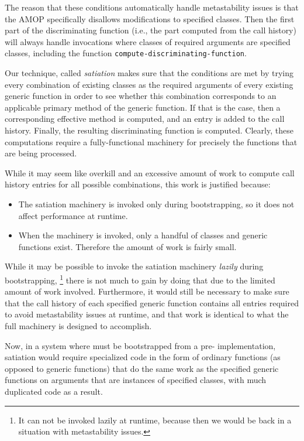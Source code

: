 The reason that these conditions automatically handle
metastability issues is that the AMOP specifically disallows
modifications to specified classes.  Then the first part of the
discriminating function (i.e., the part computed from the call
history) will always handle invocations where classes of required
arguments are specified classes, including the function
\texttt{compute-discriminating-function}. 

Our technique, called \emph{satiation} makes sure that the
conditions are met by trying every combination of existing classes as
the required arguments of every existing generic function in order to
see whether this combination corresponds to an applicable primary
method of the generic function.  If that is the case, then a
corresponding effective method is computed, and an entry is added to
the call history.  Finally, the resulting discriminating function is
computed.  Clearly, these computations require a fully-functional
machinery for precisely the functions that are being processed. 

While it may seem like overkill and an excessive amount of work to
compute call history entries for all possible combinations, this work
is justified because:

\begin{itemize}
\item The satiation machinery is invoked only during bootstrapping, so
  it does not affect performance at runtime. 
\item When the machinery is invoked, only a handful of classes and
  generic functions exist.  Therefore the amount of work is fairly
  small. 
\end{itemize}

While it may be possible to invoke the satiation machinery
\emph{lazily} during bootstrapping,%
\footnote{It can not be invoked lazily at runtime, because then we
  would be back in a situation with metastability issues.}
there is not much to gain by doing that due to the limited amount of
work involved.  Furthermore, it would still be necessary to make sure
that the call history of each specified generic function contains all
entries required to avoid metastability issues at runtime, and that
work is identical to what the full machinery is designed to
accomplish. 

Now, in a system where \clos{} must be bootstrapped from a pre-\clos{}
implementation, satiation would require specialized code in the form
of ordinary functions (as opposed to generic functions) that do the
same work as the specified generic functions on arguments that are
instances of specified classes, with much duplicated code as a result.

